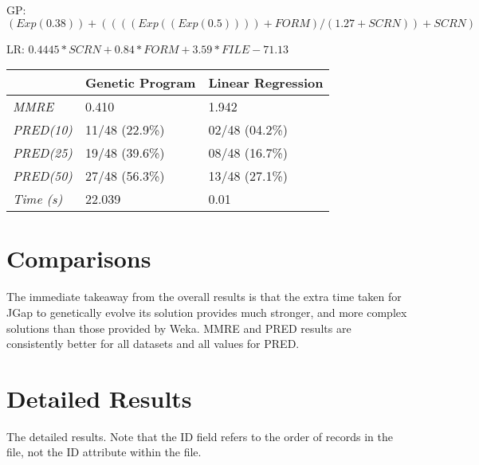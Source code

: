 \documentclass[11pt, a4paper]{article}
\begin{document}
GP: \((Exp(0.38)) + ((((Exp((Exp(0.5)))) + FORM) / (1.27 + SCRN)) + SCRN)\)

LR: \(0.4445 * SCRN + 0.84 * FORM + 3.59 * FILE - 71.13\)

\begin{tabularx}{\textwidth}{| l | X | X |}
\hline
 & \textbf{Genetic Program} & \textbf{Linear Regression} \\
\hline
\emph{MMRE} & 0.410 & 1.942 \\
\hline
\emph{PRED(10)} & 11/48 (22.9\%) & 02/48 (04.2\%) \\
\emph{PRED(25)} & 19/48 (39.6\%) & 08/48 (16.7\%) \\
\emph{PRED(50)} & 27/48 (56.3\%) & 13/48 (27.1\%) \\
\hline
\emph{Time (s)} & 22.039 & 0.01 \\
\hline
\end{tabularx}

\section{Comparisons} %
\label{sec:comparisons}
The immediate takeaway from the overall results is that the extra time taken for
JGap to genetically evolve its solution provides much stronger, and more complex
solutions than those provided by Weka. MMRE and PRED results are consistently
better for all datasets and all values for PRED.
\newpage
\appendix
\section{Detailed Results} %
\label{sec:detailed_results}
The detailed results. Note that the ID field refers to the order of records in
the file, not the ID attribute within the file.





 
\end{document}
